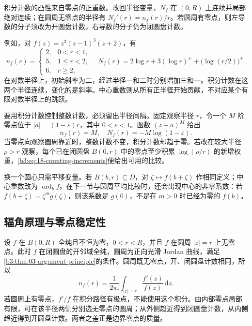 积分计数的凸性来自零点的正重数。改回半径变量，\(N_f\) 在 \((0,R)\) 上连续并局部绝对连续；在圆周无零点的半径有 \(N_f'(r)=n_f(r)/r\)。若圆周有零点，则左导数的分子须改为开圆盘计数，右导数的分子仍为闭圆盘计数。

\ProseParagraphBreak

例如，对 \(f(z)=z^2(z-1)^3(z+2)\)，有
\[
 n_f(r)=
 \begin{cases}
 2,&0<r<1,\\
 5,&1\le r<2,\\
 6,&r\ge2,
 \end{cases}
 \quad
 N_f(r)=2\log r+3(\log r)^++\bigl(\log(r/2)\bigr)^+.
\]
在对数半径上，初始斜率为二，经过半径一和二时分别增加三和一。积分计数在这两个半径连续，变化的是斜率。中心重数则从所有正半径开始贡献，不对应某个有限对数半径上的跳跃。

\ProseParagraphBreak

要用积分计数控制整数计数，必须留出半径间隔。固定观察半径 \(r\)，令一个 \(M\) 阶零点位于 \(|a|=(1-\varepsilon)r\)，其中 \(0<\varepsilon<1\)。函数 \((z-a)^M\) 给出
\[
 n_f(r)=M,\quad N_f(r)=-M\log(1-\varepsilon).
\]
当零点向观察圆周靠近时，整数计数不变，积分计数却趋于零。若改在较大半径 \(\rho>r\) 观察，每个已在闭圆盘 \(\overline{B(0,r)}\) 中的零点至少积累 \(\log(\rho/r)\) 的新增权重，\eqref{b3:eq:18-counting-increments}便给出可用的比较。

\ProseParagraphBreak

换一个圆心只需平移变量。若 \(\overline{B(b,r)}\subseteq D\)，对 \(\zeta\mapsto f(b+\zeta)\) 作相同定义；中心重数改为 \(\operatorname{ord}_bf\)。在下一节与圆周平均比较时，还会出现中心的非零系数：若 \(f(b+\zeta)=\zeta^m g(\zeta)\)，则该系数是 \(g(0)\)，不是在 \(m>0\) 时已经为零的 \(f(b)\)。

\subsection{辐角原理与零点稳定性}
\label{b3:subsec:180103}

设 \(f\) 在 \(B(0,R)\) 全纯且不恒为零，\(0<r<R\)，并且 \(f\) 在圆周 \(|z|=r\) 上无零点。此时 \(f\) 在闭圆盘的开邻域全纯，圆周为正向光滑 Jordan 曲线，满足\cref{b3:thm:03-argument-principle}的条件。圆周既无零点，开、闭圆盘计数相同，所以
\begin{equation}\label{b3:eq:18-argument-count}
 n_f(r)=\frac1{2\pi\mathrm i}\int_{|z|=r}\frac{f'(z)}{f(z)}\,\mathrm dz.
\end{equation}
若圆周上有零点，\(f'/f\) 在积分路径有极点，不能使用这个积分。由内部零点局部有限，可在该半径两侧分别选无零点的圆周；从外侧趋近得到闭圆盘计数，从内侧趋近得到开圆盘计数。两者之差正是边界零点的质量。

